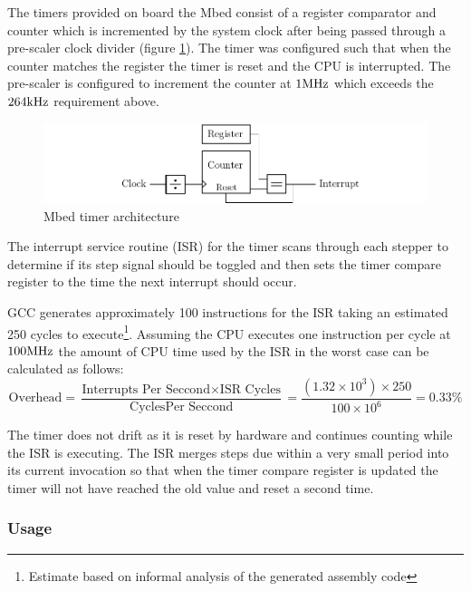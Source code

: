				The timers provided on board the Mbed consist of a register comparator
				and counter which is incremented by the system clock after being passed
				through a pre-scaler clock divider (figure \ref{fig:timerArch}). The
				timer was configured such that when the counter matches the register the
				timer is reset and the CPU is interrupted. The pre-scaler is configured
				to increment the counter at $1\textrm{MHz}$ which exceeds the $264\textrm{kHz}$
				requirement above.
				
				\begin{figure}
					\includegraphics[width=1\textwidth]{diagrams/timerArch.pdf}
					\caption{Mbed timer architecture}
					\label{fig:timerArch}
				\end{figure}
				
				The interrupt service routine (ISR) for the timer scans through each
				stepper to determine if its step signal should be toggled and then sets
				the timer compare register to the time the next interrupt should occur.
				
				GCC generates approximately 100 instructions for the ISR taking an
				estimated 250 cycles to execute\footnote{Estimate based on informal
				analysis of the generated assembly code}. Assuming the CPU executes one
				instruction per cycle at $100\textrm{MHz}$ the amount of CPU time used by the
				ISR in the worst case can be calculated as follows:
				\begin{equation}
					\textrm{Overhead} =
					\frac{\textrm{Interrupts Per Seccond} \times \textrm{ISR Cycles}}
					     {\textrm{CyclesPer Seccond}} =
					\frac{(1.32\times10^3) \times 250}
					     {100\times10^6} = 0.33\%
				\end{equation}
				
				The timer does not drift as it is reset by hardware and continues
				counting while the ISR is executing. The ISR merges steps due within a
				very small period into its current invocation so that when the timer
				compare register is updated the timer will not have reached the old
				value and reset a second time.
			
			\subsubsection{Usage}
				
